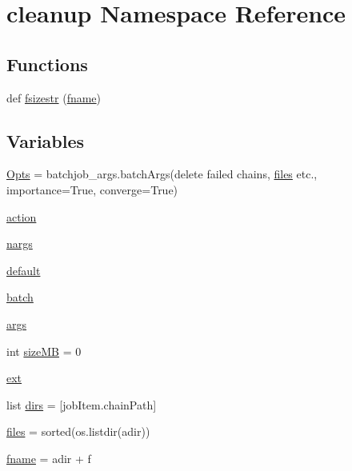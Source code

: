 \hypertarget{namespacecleanup}{}\section{cleanup Namespace Reference}
\label{namespacecleanup}
\subsection*{Functions}
\begin{DoxyCompactItemize}
\item 
def \mbox{\hyperlink{namespacecleanup_a50ecba5635ac6af7fd486fa8c051e4da}{fsizestr}} (\mbox{\hyperlink{namespacecleanup_a2af395a9b0f51de7519d72c6da8d7c67}{fname}})
\end{DoxyCompactItemize}
\subsection*{Variables}
\begin{DoxyCompactItemize}
\item 
\mbox{\hyperlink{namespacecleanup_aa1b081b2901070b9152c5dd5f7f25fde}{Opts}} = batchjob\+\_\+args.\+batch\+Args(\textquotesingle{}delete failed chains, \mbox{\hyperlink{namespacecleanup_a34b52e3d1be71a09b7fbfb3006ea52b0}{files}} etc.\textquotesingle{}, importance=True, converge=True)
\item 
\mbox{\hyperlink{namespacecleanup_afe69acba30b4c86963bf5b75ef51f599}{action}}
\item 
\mbox{\hyperlink{namespacecleanup_aaed37974fe1547d5eada93846cbae718}{nargs}}
\item 
\mbox{\hyperlink{namespacecleanup_a71788c8220703a912f1ef6a5a8866aa7}{default}}
\item 
\mbox{\hyperlink{namespacecleanup_a95f2b13fcb1cdf341f4660f92ef0cee4}{batch}}
\item 
\mbox{\hyperlink{namespacecleanup_a49993d252a7e11ade0da9d9a3e610e4a}{args}}
\item 
int \mbox{\hyperlink{namespacecleanup_a80579ad67858e587e6c83e9db7b8eb18}{size\+MB}} = 0
\item 
\mbox{\hyperlink{namespacecleanup_a72a801b1824fe1463e2869f124806df4}{ext}}
\item 
list \mbox{\hyperlink{namespacecleanup_ab33ad42082bdcb25cb281328ce766ec8}{dirs}} = \mbox{[}job\+Item.\+chain\+Path\mbox{]}
\item 
\mbox{\hyperlink{namespacecleanup_a34b52e3d1be71a09b7fbfb3006ea52b0}{files}} = sorted(os.\+listdir(adir))
\item 
\mbox{\hyperlink{namespacecleanup_a2af395a9b0f51de7519d72c6da8d7c67}{fname}} = adir + f
\end{DoxyCompactItemize}


